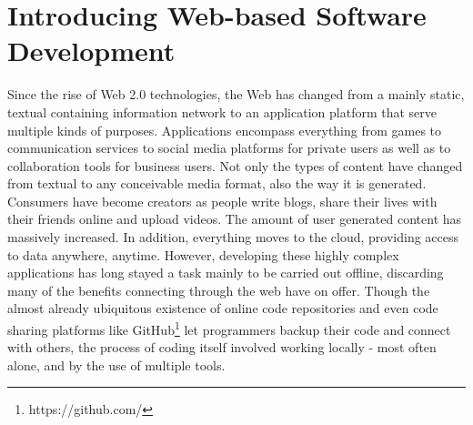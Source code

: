 \section{Introducing Web-based Software Development}
\label{sec:Introduction}

	
	
Since the rise of Web 2.0 technologies, the Web has changed from a mainly static, textual containing information network to an application platform that serve multiple kinds of purposes. Applications encompass everything from games to communication services to social media platforms for private users as well as to collaboration tools for business users. Not only the types of content have changed from textual to any conceivable media format, also the way it is generated. Consumers have become creators as people write blogs, share their lives with their friends online and upload videos. The amount of user generated content has massively increased. In addition, everything moves to the cloud, providing access to data anywhere, anytime. However, developing these highly complex applications has long stayed a task mainly to be carried out offline, discarding many of the benefits connecting through the web have on offer. Though the almost already ubiquitous existence of online code repositories and even code sharing platforms like GitHub\footnote{https://github.com/} let programmers backup their code and connect with others, the process of coding itself involved working locally - most often alone, and by the use of multiple tools.

